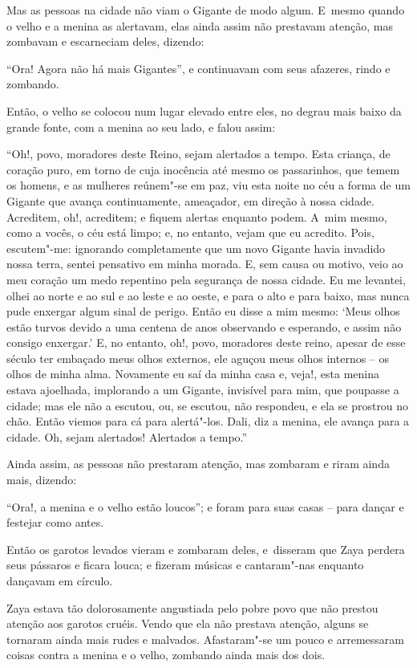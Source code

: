 Mas as pessoas na cidade não viam o Gigante de modo algum. E~mesmo quando o
velho e a menina as alertavam, elas ainda assim não prestavam atenção,
mas zombavam e escarneciam deles, dizendo:

``Ora! Agora não há mais Gigantes'', e continuavam com seus afazeres,
rindo e zombando.

Então, o velho se colocou num lugar elevado entre eles, no degrau mais
baixo da grande fonte, com a menina ao seu lado, e falou assim:

``Oh!, povo, moradores deste Reino, sejam alertados a tempo. Esta
criança, de coração puro, em torno de cuja inocência até mesmo os
passarinhos, que temem os homens, e as mulheres reúnem"-se em paz, viu
esta noite no céu a forma de um Gigante que avança continuamente,
ameaçador, em direção à nossa cidade. Acreditem, oh!, acreditem; e
fiquem alertas enquanto podem. A~mim mesmo, como a vocês, o céu está
limpo; e, no entanto, vejam que eu acredito. Pois, escutem"-me: ignorando
completamente que um novo Gigante havia invadido nossa terra, sentei
pensativo em minha morada. E, sem causa ou motivo, veio ao meu coração
um medo repentino pela segurança de nossa cidade. Eu me levantei, olhei
ao norte e ao sul e ao leste e ao oeste, e para o alto e para baixo, mas
nunca pude enxergar algum sinal de perigo. Então eu disse a mim mesmo:
`Meus olhos estão turvos devido a uma centena de anos observando e
esperando, e assim não consigo enxergar.' E, no entanto, oh!, povo,
moradores deste reino, apesar de esse século ter embaçado meus olhos
externos, ele aguçou meus olhos internos -- os olhos de minha alma.
Novamente eu saí da minha casa e, veja!, esta menina estava ajoelhada,
implorando a um Gigante, invisível para mim, que poupasse a cidade; mas
ele não a escutou, ou, se escutou, não respondeu, e ela se prostrou no
chão. Então viemos para cá para alertá"-los. Dali, diz a menina, ele
avança para a cidade. Oh, sejam alertados! Alertados a tempo.''

Ainda assim, as pessoas não prestaram atenção, mas zombaram e riram
ainda mais, dizendo:

``Ora!, a menina e o velho estão loucos''; e foram para suas casas --
para dançar e festejar como antes.

Então os garotos levados vieram e zombaram deles, e~disseram que Zaya
perdera seus pássaros e ficara louca; e fizeram músicas e cantaram"-nas
enquanto dançavam em círculo.

Zaya estava tão dolorosamente angustiada pelo pobre povo que não prestou
atenção aos garotos cruéis. Vendo que ela não prestava atenção, alguns
se tornaram ainda mais rudes e malvados. Afastaram"-se um pouco e
arremessaram coisas contra a menina e o velho, zombando ainda mais dos
dois.

